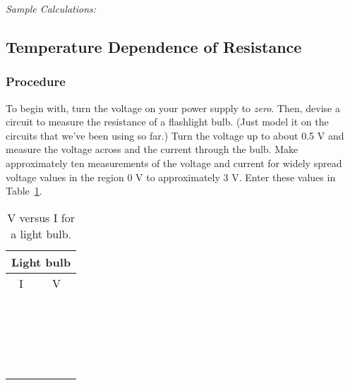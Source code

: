 \newpage

\noindent
{\it Sample Calculations:}
\vspace*{6cm}



\newpage

\subsection{Temperature Dependence of Resistance}
\subsubsection{Procedure}
To begin with, turn the voltage on your power supply to {\it zero}.
Then, devise a circuit to measure the resistance of a flashlight bulb. (Just 
model it on the circuits that we've been using so far.) Turn the voltage up to
about 0.5 V and measure the voltage across and the current through the bulb. 
Make approximately ten measurements of the voltage and current for widely 
spread voltage values in the region 0 V to approximately 3 V. Enter these values
in Table~\ref{tab:DC:ltbulbplot}.  

\begin{table}[htb]
\begin{center}
\begin{tabular}{|c|c|}
\hline
\multicolumn{2}{|c|}{Light bulb}\\
\hline
I & V \\
\hline
\hspace*{5cm} & \hspace*{5cm} \\
& \\
\hline
& \\
& \\
\hline
& \\
& \\
\hline
& \\
& \\
\hline
& \\
& \\
\hline
& \\
& \\
\hline
& \\
& \\
\hline
& \\
& \\
\hline
& \\
& \\
\hline
& \\
& \\
\hline
\end{tabular}
\end{center}
\caption{V versus I for a light bulb.}
\label{tab:DC:ltbulbplot}
\end{table}

